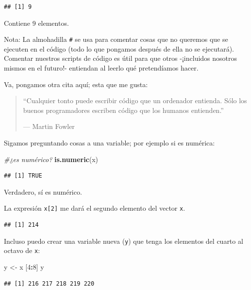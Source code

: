 \documentclass[]{book}
\newenvironment{Shaded}{\begin{snugshade}}{\end{snugshade}}
\newcommand{\CommentTok}[1]{\textcolor[rgb]{0.56,0.35,0.01}{\textit{#1}}}
\newcommand{\DecValTok}[1]{\textcolor[rgb]{0.00,0.00,0.81}{#1}}
\newcommand{\KeywordTok}[1]{\textcolor[rgb]{0.13,0.29,0.53}{\textbf{#1}}}
\newcommand{\NormalTok}[1]{#1}
\newcommand{\OperatorTok}[1]{\textcolor[rgb]{0.81,0.36,0.00}{\textbf{#1}}}
\newcommand{\StringTok}[1]{\textcolor[rgb]{0.31,0.60,0.02}{#1}}
\theoremstyle{definition}
\theoremstyle{definition}
\theoremstyle{definition}
\theoremstyle{remark}
\begin{document}
\begin{verbatim}
## [1] 9
\end{verbatim}

Contiene 9 elementos.

Nota: La almohadilla \texttt{\#} se usa para comentar cosas que no
queremos que se ejecuten en el código (todo lo que pongamos después de
ella no se ejecutará). Comentar nuestros scripts de código es útil para
que otros -¡incluidos nosotros mismos en el futuro!- entiendan al leerlo
qué pretendíamos hacer.

Va, pongamos otra cita aquí; esta que me gusta:

\begin{quote}
``Cualquier tonto puede escribir código que un ordenador entienda. Sólo
los buenos programadores escriben código que los humanos entienden.''

--- Martin Fowler
\end{quote}

Sigamos preguntando cosas a una variable; por ejemplo si es numérica:

\begin{Shaded}
\begin{Highlighting}[]
\CommentTok{#¿es numérico?}
\KeywordTok{is.numeric}\NormalTok{(x) }
\end{Highlighting}
\end{Shaded}

\begin{verbatim}
## [1] TRUE
\end{verbatim}

Verdadero, sí es numérico.

La expresión \texttt{x{[}2{]}} me dará el segundo elemento del vector
\texttt{x}.

\begin{verbatim}
## [1] 214
\end{verbatim}

Incluso puedo crear una variable nueva (\texttt{y}) que tenga los
elementos del cuarto al octavo de \texttt{x}:

\begin{Shaded}
\begin{Highlighting}[]
\NormalTok{y <-}\StringTok{ }\NormalTok{x [}\DecValTok{4}\OperatorTok{:}\DecValTok{8}\NormalTok{]}
\NormalTok{y}
\end{Highlighting}
\end{Shaded}

\begin{verbatim}
## [1] 216 217 218 219 220
\end{verbatim}
\end{document}
